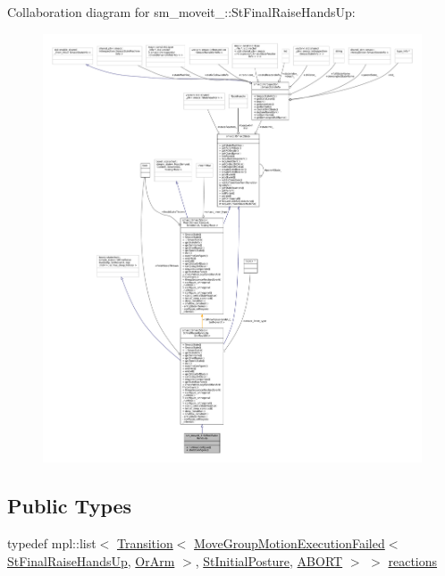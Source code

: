 Collaboration diagram for sm\+\_\+moveit\+\_\+:\+:St\+Final\+Raise\+Hands\+Up\+:
\nopagebreak
\begin{figure}[H]
\begin{center}
\leavevmode
\includegraphics[width=350pt]{structsm__moveit__4_1_1StFinalRaiseHandsUp__coll__graph}
\end{center}
\end{figure}
\subsection*{Public Types}
\begin{DoxyCompactItemize}
\item 
typedef mpl\+::list$<$ \hyperlink{classsmacc_1_1Transition}{Transition}$<$ \hyperlink{structmoveit__z__client_1_1MoveGroupMotionExecutionFailed}{Move\+Group\+Motion\+Execution\+Failed}$<$ \hyperlink{structsm__moveit__4_1_1StFinalRaiseHandsUp}{St\+Final\+Raise\+Hands\+Up}, \hyperlink{classsm__moveit__4_1_1OrArm}{Or\+Arm} $>$, \hyperlink{structsm__moveit__4_1_1StInitialPosture}{St\+Initial\+Posture}, \hyperlink{structsmacc_1_1default__transition__tags_1_1ABORT}{A\+B\+O\+RT} $>$ $>$ \hyperlink{structsm__moveit__4_1_1StFinalRaiseHandsUp_af12b19b5e2f0f5fc3bbe6e8cee4d9bb1}{reactions}
\end{DoxyCompactItemize}
